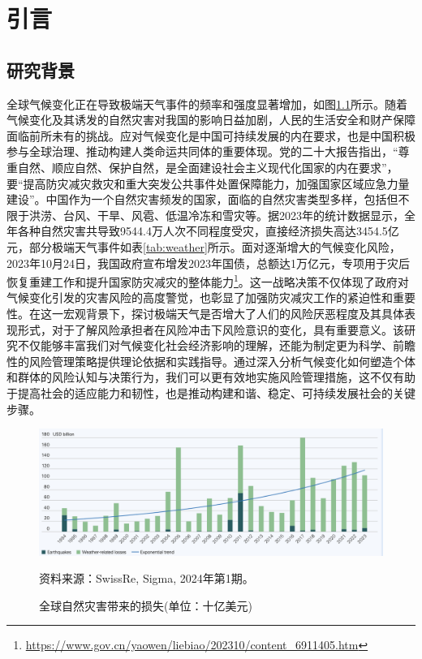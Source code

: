 \chapter{引言}
\section{研究背景}
全球气候变化正在导致极端天气事件的频率和强度显著增加，如图\ref{fig:swissre}所示。随着气候变化及其诱发的自然灾害对我国的影响日益加剧，人民的生活安全和财产保障面临前所未有的挑战。应对气候变化是中国可持续发展的内在要求，也是中国积极参与全球治理、推动构建人类命运共同体的重要体现。党的二十大报告指出，“尊重自然、顺应自然、保护自然，是全面建设社会主义现代化国家的内在要求”，要“提高防灾减灾救灾和重大突发公共事件处置保障能力，加强国家区域应急力量建设”。中国作为一个自然灾害频发的国家，面临的自然灾害类型多样，包括但不限于洪涝、台风、干旱、风雹、低温冷冻和雪灾等。据2023年的统计数据显示，全年各种自然灾害共导致9544.4万人次不同程度受灾，直接经济损失高达3454.5亿元，部分极端天气事件如表\ref{tab:weather}所示。面对逐渐增大的气候变化风险，2023年10月24日，我国政府宣布增发2023年国债，总额达1万亿元，专项用于灾后恢复重建工作和提升国家防灾减灾的整体能力\footnote{\url{https://www.gov.cn/yaowen/liebiao/202310/content_6911405.htm}}。这一战略决策不仅体现了政府对气候变化引发的灾害风险的高度警觉，也彰显了加强防灾减灾工作的紧迫性和重要性。在这一宏观背景下，探讨极端天气是否增大了人们的风险厌恶程度及其具体表现形式，对于了解风险承担者在风险冲击下风险意识的变化，具有重要意义。该研究不仅能够丰富我们对气候变化社会经济影响的理解，还能为制定更为科学、前瞻性的风险管理策略提供理论依据和实践指导。通过深入分析气候变化如何塑造个体和群体的风险认知与决策行为，我们可以更有效地实施风险管理措施，这不仅有助于提高社会的适应能力和韧性，也是推动构建和谐、稳定、可持续发展社会的关键步骤。
\begin{figure}[htbp]
    \includegraphics[width=\linewidth]{img/disaster.png}
    \caption{全球自然灾害带来的损失(单位：十亿美元)}\label{fig:swissre}
    资料来源：SwissRe, Sigma, 2024年第1期。
\end{figure}


